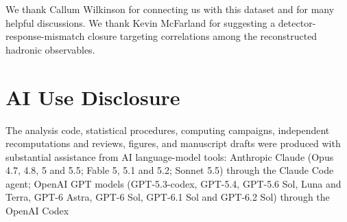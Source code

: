 \documentclass[11pt]{article}
\begin{document}
We thank Callum Wilkinson for connecting us with this dataset and for many helpful discussions.
We thank Kevin McFarland for suggesting a detector-response-mismatch closure
targeting correlations among the reconstructed hadronic observables.

\section*{AI Use Disclosure}
\label{sec:ai-use-disclosure}
The analysis code, statistical procedures, computing campaigns, independent recomputations and reviews, figures, and
manuscript drafts were produced with substantial assistance from AI language-model tools: Anthropic Claude (Opus 4.7,
4.8, 5 and 5.5; Fable 5, 5.1 and 5.2; Sonnet 5.5) through the Claude Code agent; OpenAI GPT models (GPT-5.3-codex,
GPT-5.4, GPT-5.6 Sol, Luna and Terra, GPT-6 Astra, GPT-6 Sol, GPT-6.1 Sol and GPT-6.2 Sol) through the OpenAI Codex
\end{document}
